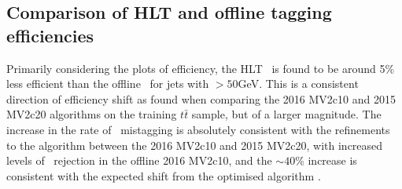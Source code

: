 	\subsection{Comparison of HLT and offline tagging efficiencies}

		Primarily considering the \pt plots of efficiency, the HLT \btag\, is found to be around 5\% less efficient than the offline \btag\, for jets with \pt$>50$GeV. This is a consistent direction of efficiency shift as found when comparing the 2016 MV2c10 and 2015 MV2c20 algorithms on the training $t\bar{t}$ sample, but of a larger magnitude. The increase in the rate of \cjet\, mistagging is absolutely consistent with the refinements to the algorithm between the 2016 MV2c10 and 2015 MV2c20, with increased levels of \cjet\, rejection in the offline 2016 MV2c10, and the $\sim40$\% increase is consistent with the expected shift from the optimised algorithm \cite{btagOptimisation}.


\endinput
